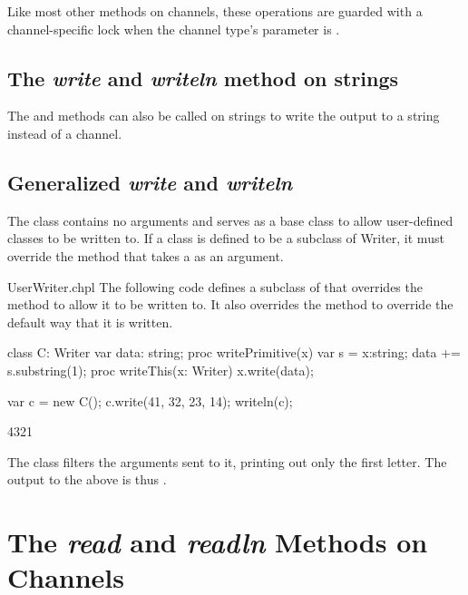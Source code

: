 Like most other methods on channels,
these operations are guarded with a channel-specific lock
when the channel type's  parameter is .


\subsection{The {\em write} and {\em writeln} method on strings}
\label{stringwrite}

The  and  methods can also be called on
strings to write the output to a string instead of a channel.

\subsection{Generalized {\em write} and {\em writeln}}
\label{writer}

The  class contains no arguments and serves as a base
class to allow user-defined classes to be written to.  If a class is
defined to be a subclass of Writer, it must override
the  method that takes a  as an argument.

\begin{chapelexample}{UserWriter.chpl}
The following code defines a subclass of  that overrides
the  method to allow it to be written to.  It also
overrides the  method to override the default way that
it is written.
\begin{chapel}
class C: Writer {
  var data: string;
  proc writePrimitive(x) {
    var s = x:string;
    data += s.substring(1);
  }
  proc writeThis(x: Writer) {
    x.write(data);
  }
}

var c = new C();
c.write(41, 32, 23, 14);
writeln(c);
\end{chapel}
\begin{chapelprintoutput}
4321
\end{chapelprintoutput}
The  class filters the arguments sent to it, printing out only
the first letter.  The output to the above is thus .
\end{chapelexample}


\section{The {\em read} and {\em readln} Methods on Channels}
\label{IO_channel_read}

